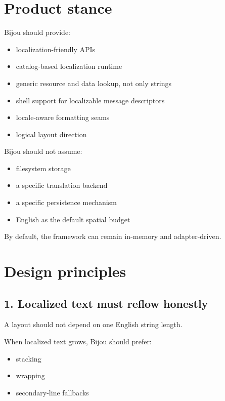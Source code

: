 \section{Product stance}\label{record-051-product-stance}

Bijou should provide:

\begin{itemize}
\tightlist
\item
  localization-friendly APIs
\item
  catalog-based localization runtime
\item
  generic resource and data lookup, not only strings
\item
  shell support for localizable message descriptors
\item
  locale-aware formatting seams
\item
  logical layout direction
\end{itemize}

Bijou should not assume:

\begin{itemize}
\tightlist
\item
  filesystem storage
\item
  a specific translation backend
\item
  a specific persistence mechanism
\item
  English as the default spatial budget
\end{itemize}

By default, the framework can remain in-memory and adapter-driven.

\section{Design principles}\label{record-051-design-principles}

\subsection{1. Localized text must reflow honestly}\label{record-051-localized-text-must-reflow-honestly}

A layout should not depend on one English string length.

When localized text grows, Bijou should prefer:

\begin{itemize}
\tightlist
\item
  stacking
\item
  wrapping
\item
  secondary-line fallbacks
\end{itemize}

